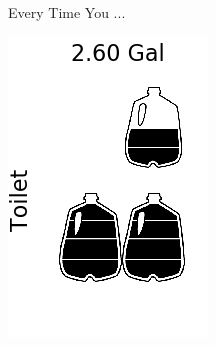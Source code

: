 \documentclass[paperwidth=11in,paperheight=8.5in,fontscale=1]{baposter} %
\begin{document}
\begin{poster}
\begin{posterbox}[column=0,row=.05,span=1,textborder=rounded,headerborder=open,height=.6,name=misc,textfont=\footnotesize, boxheaderheight=.25in]{ Every Time You ...}
\begin{minipage}[b][][b]{.24\textwidth}
\end{minipage}
\begin{minipage}[b][][b]{.24\textwidth}
		\includegraphics[width=\textwidth]{Toilet_icon.png}
\end{minipage}
\begin{minipage}[b][][b]{.24\textwidth}

\end{minipage}
\end{posterbox}
\end{poster}
\end{document}
